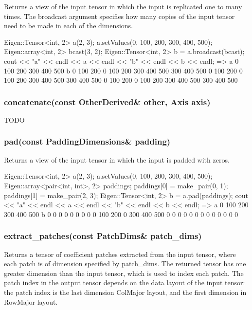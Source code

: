 Returns a view of the input tensor in which the input is replicated one to many times. The broadcast argument specifies how many copies of the input tensor need to be made in each of the dimensions. \begin{DoxyVerb}Eigen::Tensor<int, 2> a(2, 3);
a.setValues({{0, 100, 200}, {300, 400, 500}});
Eigen::array<int, 2> bcast({3, 2});
Eigen::Tensor<int, 2> b = a.broadcast(bcast);
cout << "a" << endl << a << endl << "b" << endl << b << endl;
=>
a
   0   100   200
 300   400   500
b
   0   100   200    0   100   200
 300   400   500  300   400   500
   0   100   200    0   100   200
 300   400   500  300   400   500
   0   100   200    0   100   200
 300   400   500  300   400   500
\end{DoxyVerb}


\subsubsection*{concatenate(const Other\+Derived\& other, Axis axis)}

T\+O\+DO

\subsubsection*{pad(const Padding\+Dimensions\& padding)}

Returns a view of the input tensor in which the input is padded with zeros. \begin{DoxyVerb}Eigen::Tensor<int, 2> a(2, 3);
a.setValues({{0, 100, 200}, {300, 400, 500}});
Eigen::array<pair<int, int>, 2> paddings;
paddings[0] = make_pair(0, 1);
paddings[1] = make_pair(2, 3);
Eigen::Tensor<int, 2> b = a.pad(paddings);
cout << "a" << endl << a << endl << "b" << endl << b << endl;
=>
a
   0   100   200
 300   400   500
b
   0     0     0    0
   0     0     0    0
   0   100   200    0
 300   400   500    0
   0     0     0    0
   0     0     0    0
   0     0     0    0
\end{DoxyVerb}


\subsubsection*{extract\+\_\+patches(const Patch\+Dims\& patch\+\_\+dims)}

Returns a tensor of coefficient patches extracted from the input tensor, where each patch is of dimension specified by \textquotesingle{}patch\+\_\+dims\textquotesingle{}. The returned tensor has one greater dimension than the input tensor, which is used to index each patch. The patch index in the output tensor depends on the data layout of the input tensor\+: the patch index is the last dimension Col\+Major layout, and the first dimension in Row\+Major layout.

